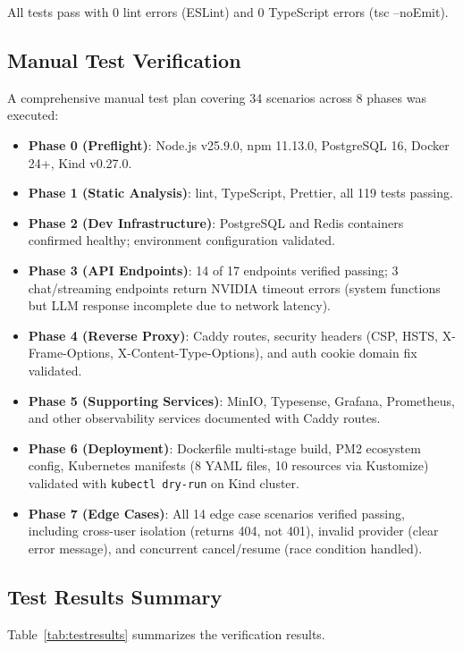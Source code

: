 \documentclass[conference]{IEEEtran}
\begin{document}
All tests pass with 0 lint errors (ESLint) and 0 TypeScript errors (tsc --noEmit).

\subsection{Manual Test Verification}

A comprehensive manual test plan covering 34 scenarios across 8 phases was executed:

\begin{itemize}
  \item \textbf{Phase 0 (Preflight)}: Node.js v25.9.0, npm 11.13.0, PostgreSQL 16, Docker 24+, Kind v0.27.0.
  \item \textbf{Phase 1 (Static Analysis)}: lint, TypeScript, Prettier, all 119 tests passing.
  \item \textbf{Phase 2 (Dev Infrastructure)}: PostgreSQL and Redis containers confirmed healthy; environment configuration validated.
  \item \textbf{Phase 3 (API Endpoints)}: 14 of 17 endpoints verified passing; 3 chat/streaming endpoints return NVIDIA timeout errors (system functions but LLM response incomplete due to network latency).
  \item \textbf{Phase 4 (Reverse Proxy)}: Caddy routes, security headers (CSP, HSTS, X-Frame-Options, X-Content-Type-Options), and auth cookie domain fix validated.
  \item \textbf{Phase 5 (Supporting Services)}: MinIO, Typesense, Grafana, Prometheus, and other observability services documented with Caddy routes.
  \item \textbf{Phase 6 (Deployment)}: Dockerfile multi-stage build, PM2 ecosystem config, Kubernetes manifests (8 YAML files, 10 resources via Kustomize) validated with \texttt{kubectl dry-run} on Kind cluster.
  \item \textbf{Phase 7 (Edge Cases)}: All 14 edge case scenarios verified passing, including cross-user isolation (returns 404, not 401), invalid provider (clear error message), and concurrent cancel/resume (race condition handled).
\end{itemize}

\subsection{Test Results Summary}

Table~\ref{tab:testresults} summarizes the verification results.
\end{document}
